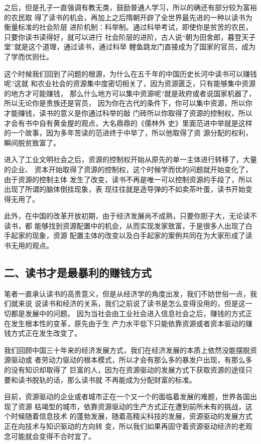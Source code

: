 \documentclass[11pt]{ctexart}
\begin{document}
{{{{之后，但是孔子一直强调有教无类，鼓励普通人学习，所以的确还有部分较为富裕的农民取
得了读书的机会，再加上之后隋朝开辟了全世界最先进的一种以读书为衡量标准的社会阶层
进阶机制：科举制。通过科举考试，即使你是贫苦的农民，只要你读书读得好，就可以进行
社会阶层的进阶，古人说“朝为田舍郎，暮登天子堂”就是这个道理，通过读书，通过科举
鲤鱼跳龙门直接成为了国家的官员，成为了学而优则仕。

这个时候我们回到了问题的根源，为什么在五千年的中国历史长河中读书可以赚钱呢?这就
和农业社会的资源集中度密切相关了，因为资源匮乏，只有能够集中资源的地方才可能赚钱，
那么什么地方可以集中资源呢?就是政府或者说国家机器了，所以无论你是贵族还是官员，
因为你在古代的条件下，你可以集中资源，所以你才能赚钱，读书的意义是你通过科举的敲
门砖所以你取得了资源的控制权，所以才会有书中自有黄金屋的观点，大名鼎鼎的《儒林外
史》里面范进中举就是这样的一个故事，因为多年苦读的范进终于中举了，所以他取得了资
源分配的权利，瞬间脱贫致富了。

进入了工业文明社会之后，资源的控制权开始从原先的单一主体进行转移了，大量的企业、
资本开始取得了资源的控制权，这个时候学而优的问题就开始变化了，由于资源的控制主体
发生了改变，读书不再是唯一可以控制资源的手段了，所以出现了所谓的脑体倒挂现象，表
现往往就是造导弹的不如卖茶叶蛋，读书开始变得无用了。

此外，在中国的改革开放初期，由于经济发展尚不成熟，只要你胆子大，无论读不读书，都
能够找到资源配置中的机会，从而实现发家致富，于是很多人出现了白手起家的现象，资源
配置主体的改变以及白手起家的案例共同在为大家形成了读书无用的观点。

\subsection{二、读书才是最暴利的赚钱方式}
\label{sec:org165a1f5}
笔者一直承认读书的高贵意义，但是从经济学的角度出发，我们不妨世俗一点，我们就来说
说读书和经济的关系，我们之前说了读书是怎么变得没用的，但是这一切都是发展中的问题。
因为当社会由工业社会进入信息社会之后，赚钱的方式正在发生根本性的变革，原先由于生
产力水平低下只能依靠资源或者资本驱动的赚钱方式正在发生改变了。

我们回顾中国三十年来的经济发展方式，我们在经济发展的本质上依然没能摆脱资源驱动或
者劳动力驱动的根本模式，所以才会有那么多的暴发户出现，有那么多的没有知识却取得了
巨富的人，因为在资源驱动的发展方式下获取资源的途径只要和读书脱轨的话，那么读书就
不再能成为分配财富的标准。

目前，资源驱动的企业或者城市正在一个又一个的面临着发展的难题，世界各国出现了资源
枯竭型的城市，依靠资源驱动的生产方式正在遭到前所未有的挑战，这个时候随着信息技术
的蓬勃发展，随着高精尖科技的发展，资源驱动的发展方式正在向技术与知识驱动的方向转
变，所以我们如果再固守着资源驱动经济的老观念可能就会变得不合时宜了。

}}}}
\end{document}
